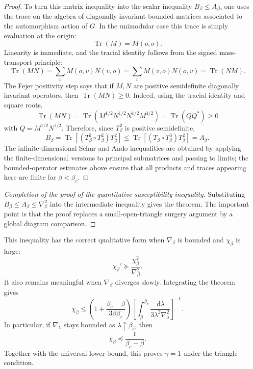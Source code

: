 \documentclass[11pt,reqno]{book}
\numberwithin{equation}{chapter}
\theoremstyle{plain}
\theoremstyle{definition}
\theoremstyle{remark}
\newcommand{\1}{\mathbf 1}
\newcommand{\dd}{\,\mathrm d}
\newcommand{\pre}{\preceq}
\newcommand{\suc}{\succeq}
\begin{document}
\begin{proof}
To turn this matrix inequality into the scalar inequality \(B_\beta\leq A_\beta\), one uses the trace on the algebra of diagonally invariant bounded matrices associated to the automorphism action of \(G\). In the unimodular case this trace is simply evaluation at the origin:
\[
  \operatorname{Tr}(M)=M(o,o).
\]
Linearity is immediate, and the tracial identity follows from the signed
mass-transport principle:
\[
  \operatorname{Tr}(MN)
  =
  \sum_v M(o,v)N(v,o)
  =
  \sum_v M(v,o)N(o,v)
  =
  \operatorname{Tr}(NM).
\]
The Fejer positivity step says that if \(M,N\) are positive semidefinite
diagonally invariant operators, then \(\operatorname{Tr}(MN)\geq0\). Indeed,
using the tracial identity and square roots,
\[
  \operatorname{Tr}(MN)
  =
  \operatorname{Tr}(M^{1/2}N^{1/2}N^{1/2}M^{1/2})
  =
  \operatorname{Tr}(QQ^\ast)\geq0
\]
with \(Q=M^{1/2}N^{1/2}\). Therefore, since \(T_\beta^2\) is positive
semidefinite,
\[
  B_\beta
  =
  \operatorname{Tr}\!\left[(T_\beta^2\circ T_\beta^2)T_\beta^2\right]
  \leq
  \operatorname{Tr}\!\left[(T_\beta\circ T_\beta^3)T_\beta^2\right]
  =
  A_\beta.
\]
The infinite-dimensional Schur and Ando inequalities are obtained by applying
the finite-dimensional versions to principal submatrices and passing to
limits; the bounded-operator estimates above ensure that all products and
traces appearing here are finite for \(\beta<\beta_c\).
\end{proof}

\begin{proof}[Completion of the proof of the quantitative susceptibility inequality]
Substituting \(B_\beta\leq A_\beta\leq\nabla_\beta^2\) into the intermediate inequality gives the theorem. The important point is that the proof replaces a small-open-triangle surgery argument by a global diagram comparison.
\end{proof}

This inequality has the correct qualitative form when $\nabla_\beta$ is bounded and $\chi_\beta$ is large:
\[
  \chi_\beta'\suc \frac{\chi_\beta^2}{\nabla_\beta^2}.
\]
It also remains meaningful when $\nabla_\beta$ diverges slowly. Integrating the theorem gives
\[
  \chi_\beta
  \leq
  \left(1+\frac{\beta_c-\beta}{3\beta\beta_c}\right)
  \left[
  \int_\beta^{\beta_c}
  \frac{\dd\lambda}{3\lambda^2\nabla_\lambda^2}
  \right]^{-1}.
\]
In particular, if $\nabla_\lambda$ stays bounded as $\lambda\uparrow\beta_c$, then
\[
  \chi_\beta\pre \frac1{\beta_c-\beta}.
\]
Together with the universal lower bound, this proves $\gamma=1$ under the triangle condition.
\end{document}
